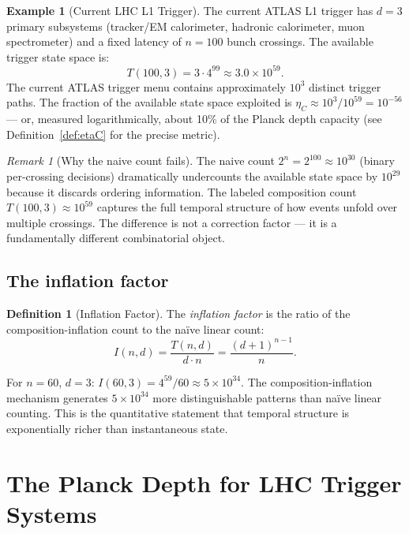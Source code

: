 \documentclass[twocolumn,10pt,a4paper]{article}
\theoremstyle{thmstyle}
\theoremstyle{definition}
\newtheorem{definition}[theorem]{Definition}
\newtheorem{example}[theorem]{Example}
\theoremstyle{remark}
\newtheorem{remark}[theorem]{Remark}
\newcommand{\etaC}{\eta_{C}}
\begin{document}
\begin{example}[Current LHC L1 Trigger]
The current ATLAS L1 trigger has $d = 3$ primary subsystems (tracker/EM
calorimeter, hadronic calorimeter, muon spectrometer) and a fixed latency of
$n = 100$ bunch crossings.
The available trigger state space is:
\[
T(100, 3) = 3 \cdot 4^{99} \approx 3.0 \times 10^{59}.
\]
The current ATLAS trigger menu contains approximately $10^3$ distinct trigger
paths. The fraction of the available state space exploited is
$\etaC \approx 10^3 / 10^{59} = 10^{-56}$
— or, measured logarithmically, about 10\% of the Planck depth capacity
(see Definition~\ref{def:etaC} for the precise metric).
\end{example}

\begin{remark}[Why the naive count fails]
The naive count $2^n = 2^{100} \approx 10^{30}$ (binary per-crossing decisions)
dramatically undercounts the available state space by $10^{29}$ because it
discards ordering information. The labeled composition count $T(100,3) \approx
10^{59}$ captures the full temporal structure of how events unfold over
multiple crossings. The difference is not a correction factor — it is a
fundamentally different combinatorial object.
\end{remark}

\subsection{The inflation factor}

\begin{definition}[Inflation Factor]
The \emph{inflation factor} is the ratio of the composition-inflation count
to the na\"ive linear count:
\[
I(n, d) = \frac{T(n,d)}{d \cdot n} = \frac{(d+1)^{n-1}}{n}.
\]
\end{definition}

For $n = 60$, $d = 3$: $I(60,3) = 4^{59}/60 \approx 5 \times 10^{34}$.
The composition-inflation mechanism generates $5 \times 10^{34}$ more
distinguishable patterns than na\"ive linear counting. This is the
quantitative statement that temporal structure is exponentially richer
than instantaneous state.

\section{The Planck Depth for LHC Trigger Systems}
\label{sec:planck}
\end{document}
